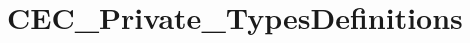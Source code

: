 \hypertarget{group___c_e_c___private___types_definitions}{\section{C\-E\-C\-\_\-\-Private\-\_\-\-Types\-Definitions}
\label{group___c_e_c___private___types_definitions}
}
